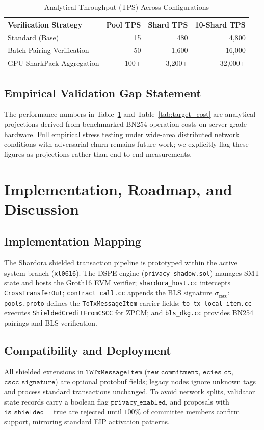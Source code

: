 \documentclass[sigconf,nonacm]{acmart}
\begin{document}
\begin{table}[H]
\centering
\caption{Analytical Throughput (TPS) Across Configurations}
\label{tab:tps_projections}
\small
\begin{tabular}{lrrr}
\toprule
\textbf{Verification Strategy} & \textbf{Pool TPS} & \textbf{Shard TPS} & \textbf{10-Shard TPS} \\
\midrule
Standard (Base) & 15 & 480 & 4{,}800 \\
Batch Pairing Verification & 50 & 1{,}600 & 16{,}000 \\
GPU SnarkPack Aggregation & 100+ & 3{,}200+ & 32{,}000+ \\
\bottomrule
\end{tabular}
\end{table}

\subsection{Empirical Validation Gap Statement}
The performance numbers in Table~\ref{tab:tps_projections} and Table~\ref{tab:target_cost} are analytical projections derived from benchmarked BN254 operation costs on server-grade hardware. Full empirical stress testing under wide-area distributed network conditions with adversarial churn remains future work; we explicitly flag these figures as projections rather than end-to-end measurements.

\section{Implementation, Roadmap, and Discussion}

\subsection{Implementation Mapping}
The Shardora shielded transaction pipeline is prototyped within the active system branch (\texttt{xl0616}). The DSPE engine (\texttt{privacy\_shadow.sol}) manages SMT state and hosts the Groth16 EVM verifier; \texttt{shardora\_host.cc} intercepts \texttt{CrossTransferOut}; \texttt{contract\_call.cc} appends the BLS signature $\sigma_{\text{cscc}}$; \texttt{pools.proto} defines the \texttt{ToTxMessageItem} carrier fields; \texttt{to\_tx\_local\_item.cc} executes \texttt{ShieldedCreditFromCSCC} for ZPCM; and \texttt{bls\_dkg.cc} provides BN254 pairings and BLS verification.

\subsection{Compatibility and Deployment}
All shielded extensions in $\mathtt{ToTxMessageItem}$ ($\mathtt{new\_commitment}$, $\mathtt{ecies\_ct}$, $\mathtt{cscc\_signature}$) are optional protobuf fields; legacy nodes ignore unknown tags and process standard transactions unchanged. To avoid network splits, validator state records carry a boolean flag $\mathtt{privacy\_enabled}$, and proposals with $\mathtt{is\_shielded} = \text{true}$ are rejected until $100\%$ of committee members confirm support, mirroring standard EIP activation patterns.
\end{document}
